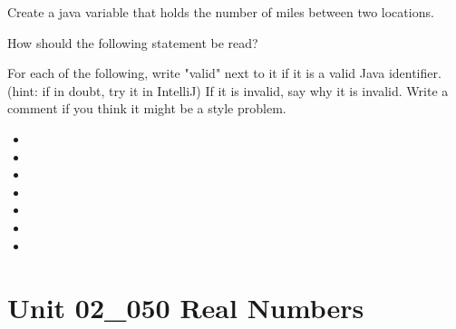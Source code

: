 \documentclass[letterpaper,12pt]{exam}
\newcommand{\unit}{Unit 02}
\begin{document}
\begin{questions}
\begin{samepage}
	\question Create a java variable that holds the number of miles between two locations.
	\vspace{5mm}
\end{samepage}
\begin{samepage}
	\question How should the following statement be read?  
	\vspace{5mm}
\end{samepage}
\pagebreak
\begin{samepage}
	\question For each of the following, write "valid" next to it if it is a valid Java identifier. (hint:  if in doubt, try it in IntelliJ)  If it is invalid, say why it is invalid. Write a comment if you think it might be a style problem.
	\begin{itemize}
		\item {}
		\vspace{5mm}
		\item {}
		\vspace{5mm}
		\item {}
		\vspace{5mm}
		\item {}
		\vspace{5mm}
		\item {}
		\vspace{5mm}
		\item {}
		\vspace{5mm}
		\item {}
		\vspace{5mm}
	   \end{itemize}
\end{samepage}
\section*{\unit\_050 Real Numbers} %


\end{questions}
\end{document}
